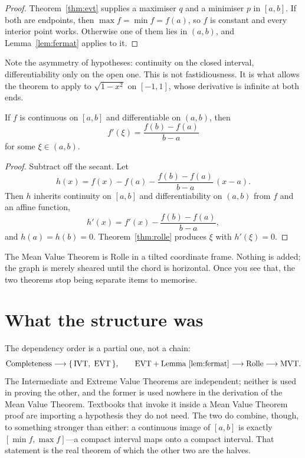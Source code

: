 \documentclass{essay}
\begin{document}
\begin{proof}
Theorem~\ref{thm:evt} supplies a maximiser $q$ and a minimiser $p$ in $[a,b]$. If both are endpoints, then $\max f = \min f = f(a)$, so $f$ is constant and every interior point works. Otherwise one of them lies in $(a,b)$, and Lemma~\ref{lem:fermat} applies to it.
\end{proof}

Note the asymmetry of hypotheses: continuity on the closed interval, differentiability only on the open one. This is not fastidiousness. It is what allows the theorem to apply to $\sqrt{1 - x^{2}}$ on $[-1,1]$, whose derivative is infinite at both ends.

\begin{theorem}\label{thm:mvt}
If $f$ is continuous on $[a,b]$ and differentiable on $(a,b)$, then
\[
f'(\xi) = \frac{f(b) - f(a)}{b - a}
\]
for some $\xi \in (a,b)$.
\end{theorem}

\begin{proof}
Subtract off the secant. Let
\[
h(x) = f(x) - f(a) - \frac{f(b) - f(a)}{b - a}\,(x - a).
\]
Then $h$ inherits continuity on $[a,b]$ and differentiability on $(a,b)$ from $f$ and an affine function,
\[
h'(x) = f'(x) - \frac{f(b) - f(a)}{b - a},
\]
and $h(a) = h(b) = 0$. Theorem~\ref{thm:rolle} produces $\xi$ with $h'(\xi) = 0$.
\end{proof}

The Mean Value Theorem is Rolle in a tilted coordinate frame. Nothing is added; the graph is merely sheared until the chord is horizontal. Once you see that, the two theorems stop being separate items to memorise.

\section{What the structure was}

The dependency order is a partial one, not a chain:
\[
\text{Completeness} \longrightarrow \{\,\text{IVT},\ \text{EVT}\,\},
\qquad
\text{EVT} + \text{Lemma \ref{lem:fermat}} \longrightarrow \text{Rolle} \longrightarrow \text{MVT}.
\]
The Intermediate and Extreme Value Theorems are independent; neither is used in proving the other, and the former is used nowhere in the derivation of the Mean Value Theorem. Textbooks that invoke it inside a Mean Value Theorem proof are importing a hypothesis they do not need. The two do combine, though, to something stronger than either: a continuous image of $[a,b]$ is exactly $[\min f, \max f]$---a compact interval maps onto a compact interval. That statement is the real theorem of which the other two are the halves.
\end{document}
